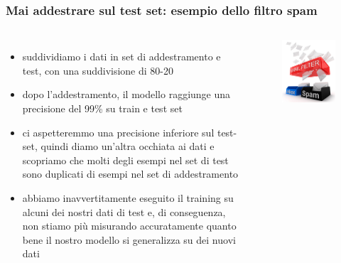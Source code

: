 \begin{frame}

	\frametitle{Mai addestrare sul test set: esempio dello filtro spam}

	\begin{columns}
			\begin{itemize}
				\item suddividiamo i dati in set di addestramento e test, con una suddivisione di 80-20
				\item dopo l'addestramento, il modello raggiunge una precisione del 99\% su train e test set
				\item ci aspetteremmo una precisione inferiore sul test-set, quindi diamo un'altra occhiata ai dati e scopriamo che molti degli esempi nel set di test sono duplicati di esempi nel set di addestramento%
				\item abbiamo inavvertitamente eseguito il training su alcuni dei nostri dati di test e, di conseguenza, non stiamo più misurando accuratamente quanto bene il nostro modello si generalizza su dei nuovi dati
			\end{itemize}

			\begin{figure}[!htbp]
				\centering
				\includegraphics[width=1.0\linewidth]{images/supervised/validation_test_splitting_data/spam_filter.jpg}
			\end{figure}

	\end{columns}


\end{frame}



